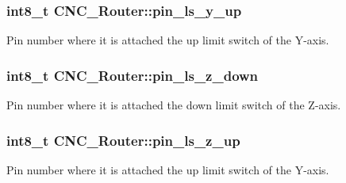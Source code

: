 \hypertarget{class_c_n_c___router_a056de16bac1a523455a7be2903e44f40}{
\subsubsection[{pin\+\_\+ls\+\_\+y\+\_\+up}]{\setlength{\rightskip}{0pt plus 5cm}int8\+\_\+t C\+N\+C\+\_\+\+Router\+::pin\+\_\+ls\+\_\+y\+\_\+up\hspace{0.3cm}{\ttfamily [private]}}}\label{class_c_n_c___router_a056de16bac1a523455a7be2903e44f40}


Pin number where it is attached the up limit switch of the Y-\/axis. 

\hypertarget{class_c_n_c___router_aa24cd537b5d08782fa01b055cea96c7d}{
\subsubsection[{pin\+\_\+ls\+\_\+z\+\_\+down}]{\setlength{\rightskip}{0pt plus 5cm}int8\+\_\+t C\+N\+C\+\_\+\+Router\+::pin\+\_\+ls\+\_\+z\+\_\+down\hspace{0.3cm}{\ttfamily [private]}}}\label{class_c_n_c___router_aa24cd537b5d08782fa01b055cea96c7d}


Pin number where it is attached the down limit switch of the Z-\/axis. 

\hypertarget{class_c_n_c___router_ae178883b237176e39f62336b70769ace}{
\subsubsection[{pin\+\_\+ls\+\_\+z\+\_\+up}]{\setlength{\rightskip}{0pt plus 5cm}int8\+\_\+t C\+N\+C\+\_\+\+Router\+::pin\+\_\+ls\+\_\+z\+\_\+up\hspace{0.3cm}{\ttfamily [private]}}}\label{class_c_n_c___router_ae178883b237176e39f62336b70769ace}


Pin number where it is attached the up limit switch of the Y-\/axis. 

